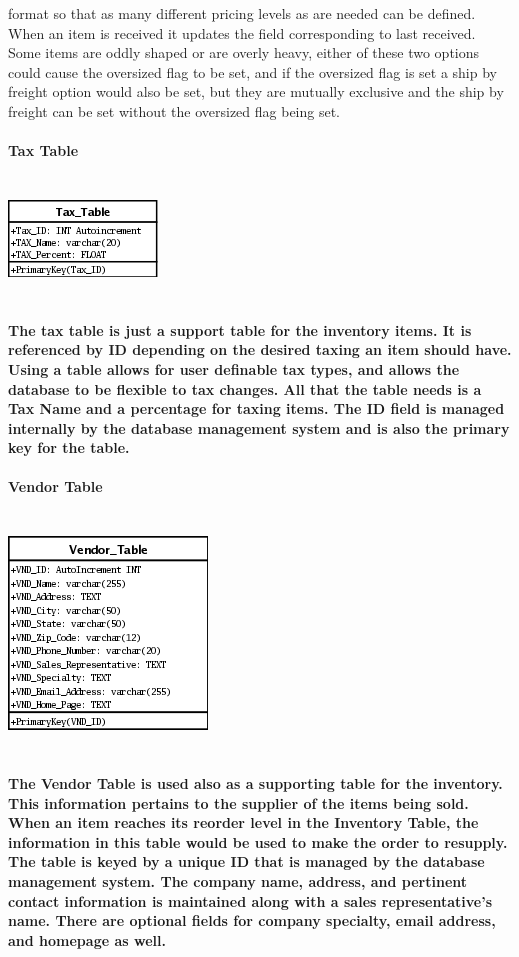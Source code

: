 \documentclass{report}
\begin{document}
	format so that as many different pricing levels as are needed can be defined. When an
	item is received it updates the field corresponding to last received. Some items are
	oddly shaped or are overly heavy, either of these two options could cause the oversized
	flag to be set, and if the oversized flag is set a ship by freight option would also be
	set, but they are mutually exclusive and the ship by freight can be set without the
	oversized flag being set.\\
	\\
	\bf{Tax Table}\\
	\\
	\\
	\includegraphics{Tables/TaxTable.png}\\
	\\
	\\
	The tax table is just a support table for the inventory items. It is referenced by ID
	depending on the desired taxing an item should have. Using a table allows for user definable
	tax types, and allows the database to be flexible to tax changes. All that the table needs
	is a Tax Name and a percentage for taxing items. The ID field is managed internally by the
	database management system and is also the primary key for the table.\\
	\\
	\bf{Vendor Table}\\
	\\
	\\
	\includegraphics{Tables/VendorTable.png}\\
	\\
	\\
	The Vendor Table is used also as a supporting table for the inventory. This information
	pertains to the supplier of the items being sold. When an item reaches its reorder level
	in the Inventory Table, the information in this table would be used to make the order to
	resupply. The table is keyed by a unique ID that is managed by the database management
	system. The company name, address, and pertinent contact information is maintained along
	with a sales representative's name. There are optional fields for company specialty, email
	address, and homepage as well.
\end{document}
